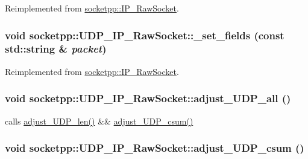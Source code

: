 Reimplemented from \hyperlink{classsocketpp_1_1IP__RawSocket_6863cc399c543073e9aa3615c3f50940}{socketpp::IP\_\-RawSocket}.\hypertarget{classsocketpp_1_1UDP__IP__RawSocket_40fde867fa138b495f660864023a3eb1}{
\subsubsection[{\_\-set\_\-fields}]{\setlength{\rightskip}{0pt plus 5cm}void socketpp::UDP\_\-IP\_\-RawSocket::\_\-set\_\-fields (const std::string \& {\em packet})}}
\label{classsocketpp_1_1UDP__IP__RawSocket_40fde867fa138b495f660864023a3eb1}




Reimplemented from \hyperlink{classsocketpp_1_1IP__RawSocket_c39832f1ad83184cd5ba94c4c967f465}{socketpp::IP\_\-RawSocket}.\hypertarget{classsocketpp_1_1UDP__IP__RawSocket_94bec31d8c856ccdafa083c74b8b7e58}{
\subsubsection[{adjust\_\-UDP\_\-all}]{\setlength{\rightskip}{0pt plus 5cm}void socketpp::UDP\_\-IP\_\-RawSocket::adjust\_\-UDP\_\-all ()}}
\label{classsocketpp_1_1UDP__IP__RawSocket_94bec31d8c856ccdafa083c74b8b7e58}


calls \hyperlink{classsocketpp_1_1UDP__RawSocket_1caa413cfe4f72d8c0aeccdcb10469b5}{adjust\_\-UDP\_\-len()} \&\& \hyperlink{classsocketpp_1_1UDP__IP__RawSocket_6c2f6c375cec90f64fd093af37369d6a}{adjust\_\-UDP\_\-csum()} 

\hypertarget{classsocketpp_1_1UDP__IP__RawSocket_6c2f6c375cec90f64fd093af37369d6a}{
\subsubsection[{adjust\_\-UDP\_\-csum}]{\setlength{\rightskip}{0pt plus 5cm}void socketpp::UDP\_\-IP\_\-RawSocket::adjust\_\-UDP\_\-csum ()}}
\label{classsocketpp_1_1UDP__IP__RawSocket_6c2f6c375cec90f64fd093af37369d6a}


